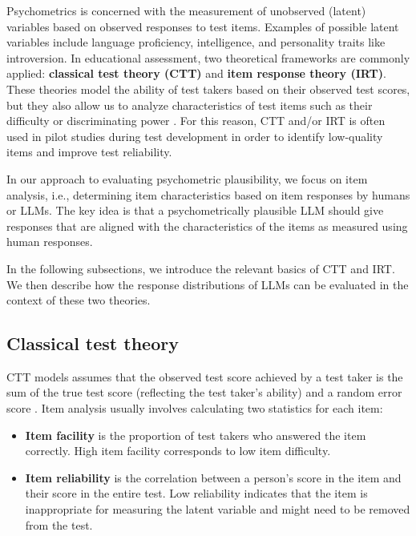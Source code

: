 \documentclass[11pt]{article}
\begin{document}
Psychometrics is concerned with the measurement of unobserved (latent) variables based on observed responses to test items. Examples of possible latent variables include language proficiency, intelligence, and personality traits like introversion. In educational assessment, two theoretical frameworks are commonly applied: \textbf{classical test theory (CTT)} and \textbf{item response theory (IRT)}. These theories model the ability of test takers based on their observed test scores, but they also allow us to analyze characteristics of test items such as their difficulty or discriminating power \citep{Livingston2011}. For this reason, CTT and/or IRT is often used in pilot studies during test development in order to identify low-quality items and improve test reliability.

In our approach to evaluating psychometric plausibility, we focus on item analysis, i.e., determining item characteristics based on item responses by humans or LLMs. The key idea is that a psychometrically plausible LLM should give responses that are aligned with the characteristics of the items as measured using human responses.

In the following subsections, we introduce the relevant basics of CTT and IRT. We then describe how the response distributions of LLMs can be evaluated in the context of these two theories.

\subsection{Classical test theory}

CTT models assumes that the observed test score achieved by a test taker is the sum of the true test score (reflecting the test taker's ability) and a random error score \citep{Hambleton1993}. Item analysis usually involves calculating two statistics for each item:

\begin{itemize}
  \item \textbf{Item facility} is the proportion of test takers who answered the item correctly. High item facility corresponds to low item difficulty.
  \item \textbf{Item reliability} is the correlation between a person's score in the item and their score in the entire test. Low reliability indicates that the item is inappropriate for measuring the latent variable and might need to be removed from the test.
\end{itemize}
\end{document}
